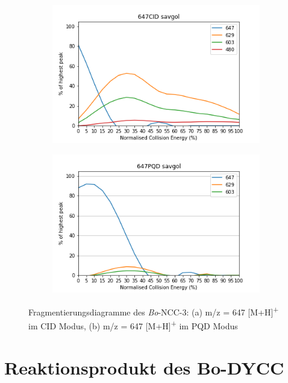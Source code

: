 \begin{figure}[!htbp]
  \begin{subfigure}[b]{0.5\textwidth}
    \includegraphics[width=\textwidth]{content/Anhang/ESIMS/Bo-NCC-3/647CID-647savgol.png}
    \caption{}
  \end{subfigure}
  \hfill
  \begin{subfigure}[b]{0.5\textwidth}
    \includegraphics[width=\textwidth]{content/Anhang/ESIMS/Bo-NCC-3/647PQD-647savgol.png}
    \caption{}
  \end{subfigure}
  
  \caption[Fragmentierungsdiagramme des \textit{Bo}-NCC-3, Quelle: Autor]{Fragmentierungsdiagramme des \textit{Bo}-NCC-3: (a) m/z = 647 [M+H]\textsuperscript{+} im CID Modus, (b) m/z = 647 [M+H]\textsuperscript{+} im PQD Modus}
\end{figure}

\section{Reaktionsprodukt des Bo-DYCC}

